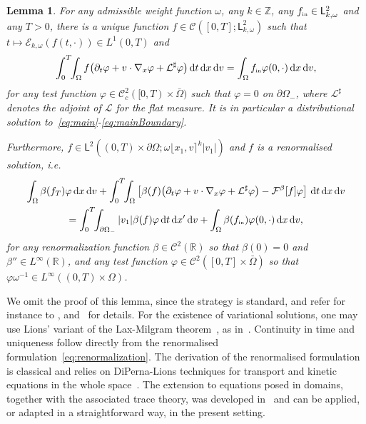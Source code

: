 \documentclass[11pt]{amsart}
\newtheorem{lemma}[theorem]{Lemma}
\theoremstyle{definition}
\theoremstyle{remark}
\numberwithin{equation}{section}
\newcommand\R{{\mathbb R}}
\newcommand\Z{{\mathbb Z}}
\newcommand{\dd}{{\, \mathrm d}}
\newcommand{\init}{\text{{\tiny {\rm in}}}}
\newcommand{\sfL}{\mathsf{L}}
\newcommand{\wangle}[1]{\lfloor #1 \rceil}
\begin{document}
  \begin{lemma}
    \label{lem:exist}
    For any admissible weight function $\omega$,  any $k \in \Z$, any $f_\init \in \sfL^2 _{k,\omega}$ and any $T>0$, there is a unique function $f \in \mathcal{C}([0,T];\sfL^{2}_{k,\omega})$ 
    such that $t \mapsto \mathcal E_{k,\omega}(f(t,\cdot)) \in L^1(0,T)$ and
    \begin{align*}
      \int_0^T \!\! \int_{\Omega} f \big( \partial_t \varphi + v \cdot \nabla_x  \varphi + \mathcal{L}^\sharp  \varphi \big) \dd t \dd x\dd v
      = \int_{\Omega} f_\init \varphi(0,\cdot) \dd x\dd v,
    \end{align*}
    for any test function $\varphi \in \mathcal{C}^2_c([0,T) \times \bar\Omega)$ such that $\varphi = 0$ on $\partial\Omega_-$, where $\mathcal{L}^\sharp$ denotes the adjoint of $\mathcal{L}$ for the flat measure. It is in particular a distributional solution   to~\eqref{eq:main}-\eqref{eq:mainBoundary}.

    Furthermore, $f \in \sfL^{2}((0,T) \times \partial\Omega;\omega \wangle{x_1,v}^k|v_1|)$ and $f$ is a \emph{renormalised solution}, i.e.
    \begin{multline}
      \label{eq:renormalization}
      \int_\Omega \beta(f_T)  \varphi \dd x\dd v + 
      \int_0^T \!\! \int_{\Omega} \left[ \beta(f) \big( \partial_t \varphi + v \cdot \nabla_x  \varphi + \mathcal{L}^\sharp  \varphi \big) - \mathcal F^\beta[f] \varphi \right] \dd t \dd x \dd v \\ 
      =   \int_0^T \!\! \int_{\partial\Omega_-} |v_1| \beta(f) \varphi \dd t \dd x' \dd v +  \int_\Omega \beta(f_\init) \varphi(0,\cdot) \dd x\dd v, 
    \end{multline}
    for any renormalization function $\beta \in \mathcal{C}^2(\R)$ so that $\beta(0) = 0$ and $\beta'' \in L^\infty(\R)$, and any test function
    $\varphi \in \mathcal{C}^2([0,T] \times \bar\Omega)$ so that  $\varphi \omega^{-1} \in L^\infty((0,T) \times \Omega)$. 
  \end{lemma}
  
We omit the proof of this lemma, since the strategy is standard, and refer for instance to \cite{sanchez2024KR}, \cite[Proof of Proposition 3.3]{carrapatoso2024KR} and~\cite[Section~2]{carrapatoso2024landau} for details. For the existence of variational solutions, one may use Lions' variant of the Lax-Milgram theorem~\cite[Chap~III, ]{MR0153974}, as in~\cite{MR875086,carrapatoso2024KR}. Continuity in time and uniqueness follow directly from the renormalised formulation~\eqref{eq:renormalization}. The derivation of the renormalised formulation is classical and relies on DiPerna-Lions techniques for transport and kinetic equations in the whole space~\cite{MR1022305,MR1014927,MR972541}. The extension to equations posed in domains, together with the associated trace theory, was developed in~\cite{MR1765137,MR2721875} and can be applied, or adapted in a straightforward way, in the present setting. 
\end{document}
